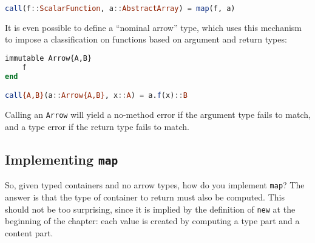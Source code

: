 \begin{singlespace}
\begin{lstlisting}[language=julia]
call(f::ScalarFunction, a::AbstractArray) = map(f, a)
\end{lstlisting}
\end{singlespace}

It is even possible to define a ``nominal arrow'' type, which uses this
mechanism to impose a classification on functions based on argument and
return types:

\begin{samepage}
\begin{singlespace}
\begin{lstlisting}[language=julia]
immutable Arrow{A,B}
    f
end

call{A,B}(a::Arrow{A,B}, x::A) = a.f(x)::B
\end{lstlisting}
\end{singlespace}
\end{samepage}

\noindent
Calling an \texttt{Arrow} will yield a no-method error if the argument
type fails to match, and a type error if the return type fails to
match.





\subsection{Implementing \texttt{map}}

So, given typed containers and no arrow types, how do you implement
\texttt{map}? The answer is that the type of container to return must
also be computed. This should not be too surprising, since it is implied by
the definition of \texttt{new} at the beginning of the chapter: each
value is created by computing a type part and a content part.

